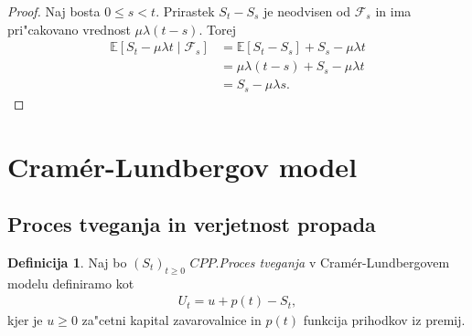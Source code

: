 \documentclass[12pt, a4paper, reqno]{amsart}
\theoremstyle{definition} %
\newtheorem{definicija}{Definicija}[section]
\theoremstyle{plain} %
\newcommand{\R}{\mathbb{R}}
\newcommand{\E}{\mathbb{E}}
\newcommand{\F}{\mathcal{F}}
\newcommand{\1}{\mathds{1}}
\begin{document}
        \begin{proof}
            Naj bosta $0 \leq s < t$. Prirastek $S_t - S_s$ je neodvisen od $\F_s$ in ima 
            pri"cakovano vrednost $\mu\lambda(t-s)$. Torej 
            \begin{align*}
                \E\left[S_t - \mu\lambda t\mid\F_s\right] 
                        &= \E\left[S_t - S_s\right] + S_s - \mu\lambda t\\
                        &= \mu\lambda(t-s) + S_s - \mu\lambda t\\
                        &= S_s - \mu\lambda s.
            \end{align*}
        \end{proof}


\section{Cramér-Lundbergov model}

    \begin{center}
    \end{center}

    \subsection{Proces tveganja in verjetnost propada}
        \begin{definicija}
            Naj bo $(S_t)_{t\geq0 }$ $CPP$.\textit{Proces tveganja} v Cramér-Lundbergovem modelu definiramo kot
            \begin{align*}
                U_t = u + p(t) - S_t,
            \end{align*}
            kjer je $u \geq 0$ za"cetni kapital zavarovalnice in $p(t)$ funkcija prihodkov iz premij. 
            \label{def:procesTveganja}
        \end{definicija}
\end{document}
